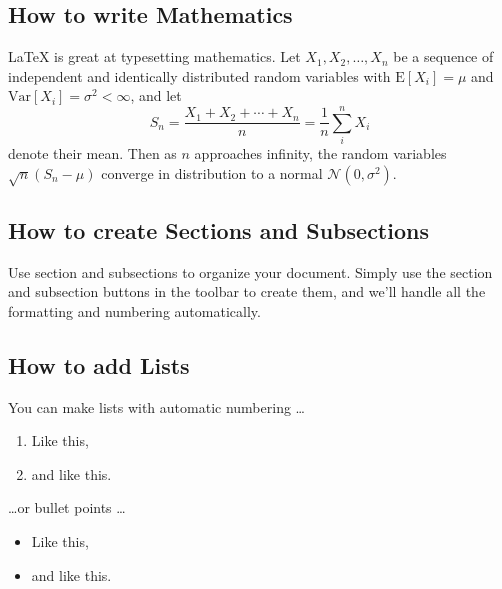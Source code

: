 \documentclass[letter]{article}
\begin{document}
\subsection{How to write Mathematics}

\LaTeX{} is great at typesetting mathematics. Let $X_1, X_2, \ldots, X_n$ be a sequence of independent and identically distributed random variables with $\text{E}[X_i] = \mu$ and $\text{Var}[X_i] = \sigma^2 < \infty$, and let
\[S_n = \frac{X_1 + X_2 + \cdots + X_n}{n}
      = \frac{1}{n}\sum_{i}^{n} X_i\]
denote their mean. Then as $n$ approaches infinity, the random variables $\sqrt{n}(S_n - \mu)$ converge in distribution to a normal $\mathcal{N}(0, \sigma^2)$.
% 
% 

\subsection{How to create Sections and Subsections}

Use section and subsections to organize your document. Simply use the section and subsection buttons in the toolbar to create them, and we'll handle all the formatting and numbering automatically.

\subsection{How to add Lists}

You can make lists with automatic numbering \dots

\begin{enumerate}
\item Like this,
\item and like this.
\end{enumerate}
\dots or bullet points \dots
\begin{itemize}
\item Like this,
\item and like this.
\end{itemize}
\end{document}

